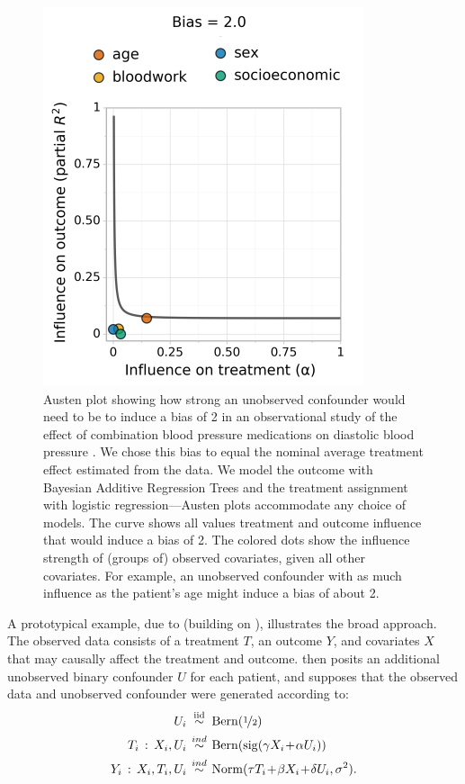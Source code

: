 \documentclass{article}
\begin{document}
\begin{figure}
  \vspace{-25pt}
  \begin{center}
    \includegraphics[height=0.48\textwidth]{figures/nhanes_dbp_log_reg_bart_vert.png}  
  \end{center}
  \vspace{-5pt}
  \caption{Austen plot showing how strong an unobserved confounder would need to be to induce
    a bias of 2 in an observational study of the effect of combination blood pressure medications on diastolic blood pressure \cite{Dorie:Harada:Carnegie:Hill:2016}. 
    We chose this bias to equal the nominal average treatment effect estimated from the data.
    We model the outcome with Bayesian Additive Regression Trees and the treatment assignment
    with logistic regression---Austen plots accommodate any choice of models.
    The curve shows all values treatment and outcome influence that would induce a bias of 2.
    The colored dots show the influence strength of (groups of) observed covariates,
    given all other covariates.
    For example, an unobserved confounder with as much influence as the patient's age
    might induce a bias of about 2.
    \label{fig:dbp-intro}}
   \vspace{-38pt}
 \end{figure}
%
%
A prototypical example, due to \citet{Imbens:2003} (building on \cite{Rosenbaum:Rubin:1983}), illustrates
the broad approach.
The observed data consists of a treatment $T$,
%
an outcome $Y$,
%
and covariates $X$ that may causally affect the treatment and outcome.
%
\citet{Imbens:2003} then posits an additional unobserved binary confounder
$U$ for each patient, and
%
supposes that the observed data and unobserved confounder
were generated according to:
\begin{align*}\label{eq:rosenbaum-rubin}
U_{i} & \distiid\bernDist(\nicefrac{1}{2})\\
T_{i}\given X_{i},U_{i} & \distind\bernDist(\mathrm{sig}(\gamma X_{i} \!+\! \alpha U_{i})) \\
Y_{i}\given X_{i},T_{i},U_{i} & \distind \mathrm{Norm}(\tau T_{i} \!+\! \beta X_{i} \!+\! \delta U_{i},\sigma^{2}). 
\end{align*}
\end{document}
